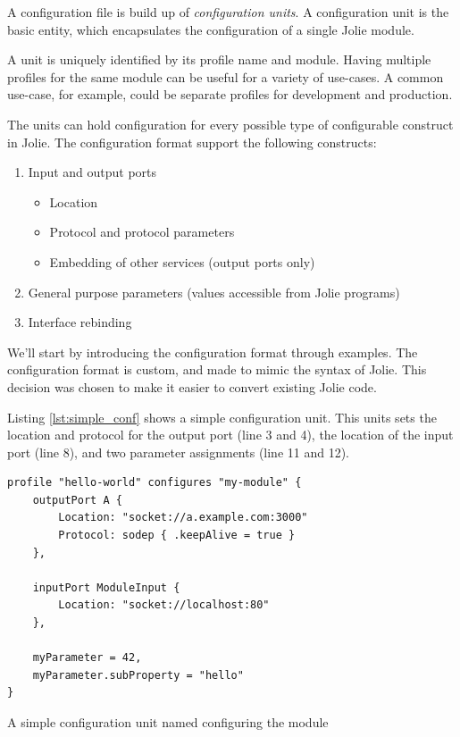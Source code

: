 
A configuration file is build up of \emph{configuration units}.  A
configuration unit is the basic entity, which encapsulates the configuration of
a single Jolie module.

A unit is uniquely identified by its profile name and module. Having multiple
profiles for the same module can be useful for a variety of use-cases. A common
use-case, for example, could be separate profiles for development and
production.

The units can hold configuration for every possible type of configurable
construct in Jolie. The configuration format support the following constructs:

\begin{enumerate}
    \item Input and output ports
        \begin{itemize}
            \item Location
            \item Protocol and protocol parameters
            \item Embedding of other services (output ports only)
        \end{itemize}
    \item General purpose parameters (values accessible from
            Jolie programs)
    \item Interface rebinding
\end{enumerate}

We'll start by introducing the configuration format through examples.  The
configuration format is custom, and made to mimic the syntax of Jolie. This
decision was chosen to make it easier to convert existing Jolie code.

Listing \ref{lst:simple_conf} shows a simple configuration unit. This
units sets the location and protocol for the output port  (line 3 and
        4), the location of the input port  (line 8), and
two parameter assignments (line 11 and 12).

\begin{listing}[H]
\begin{verbatim}
profile "hello-world" configures "my-module" {
    outputPort A {
        Location: "socket://a.example.com:3000"
        Protocol: sodep { .keepAlive = true }
    },

    inputPort ModuleInput {
        Location: "socket://localhost:80"
    },

    myParameter = 42,
    myParameter.subProperty = "hello"
}
\end{verbatim}

\caption{A simple configuration unit named 
    configuring the module }

\label{lst:simple_conf}

\end{listing}

